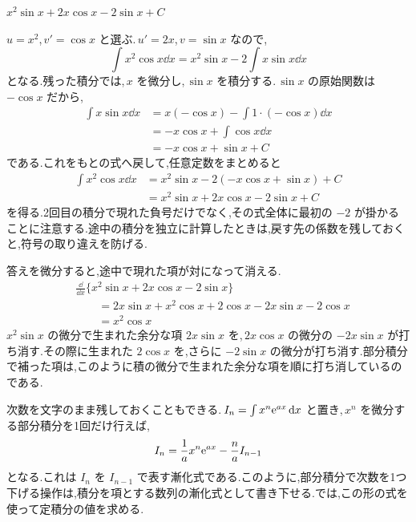 $x^2\sin x+2x\cos x-2\sin x+C$

$u=x^2$,\,$v'=\cos x$ と選ぶ.\,$u'=2x$,\,$v=\sin x$ なので,
\[
 \int x^2\cos x\dd x
 =x^2\sin x-2\int x\sin x\dd x
\]
となる.残った積分では,\,$x$ を微分し,\,$\sin x$ を積分する.\,$\sin x$ の原始関数は $-\cos x$ だから,
\[
\begin{aligned}
 \int x\sin x\dd x
 &=x(-\cos x)-\int1\cdot(-\cos x)\dd x\\
 &=-x\cos x+\int\cos x\dd x\\
 &=-x\cos x+\sin x+C
\end{aligned}
\]
である.これをもとの式へ戻して,任意定数をまとめると
\[
\begin{aligned}
 \int x^2\cos x\dd x
 &=x^2\sin x-2(-x\cos x+\sin x)+C\\
 &=x^2\sin x+2x\cos x-2\sin x+C
\end{aligned}
\]
を得る.2回目の積分で現れた負号だけでなく,その式全体に最初の $-2$ が掛かることに注意する.途中の積分を独立に計算したときは,戻す先の係数を残しておくと,符号の取り違えを防げる.

答えを微分すると,途中で現れた項が対になって消える.
\[
\begin{aligned}
 &\frac{\dd}{\dd x}
  \{x^2\sin x+2x\cos x-2\sin x\}\\
 &\qquad=2x\sin x+x^2\cos x
       +2\cos x-2x\sin x-2\cos x\\
 &\qquad=x^2\cos x
\end{aligned}
\]
$x^2\sin x$ の微分で生まれた余分な項 $2x\sin x$ を,\,$2x\cos x$ の微分の $-2x\sin x$ が打ち消す.その際に生まれた $2\cos x$ を,さらに $-2\sin x$ の微分が打ち消す.部分積分で補った項は,このように積の微分で生まれた余分な項を順に打ち消しているのである.

次数を文字のまま残しておくこともできる.\,$I_n=\int x^n\mathrm{e}^{ax}\,\mathrm{d} x$ と置き,\,$x^n$ を微分する部分積分を1回だけ行えば,
\[
 I_n=\frac1ax^n\mathrm{e}^{ax}-\frac naI_{n-1}
\]
となる.これは $I_n$ を $I_{n-1}$ で表す漸化式である.このように,部分積分で次数を1つ下げる操作は,積分を項とする数列の漸化式として書き下せる.では,この形の式を使って定積分の値を求める.
